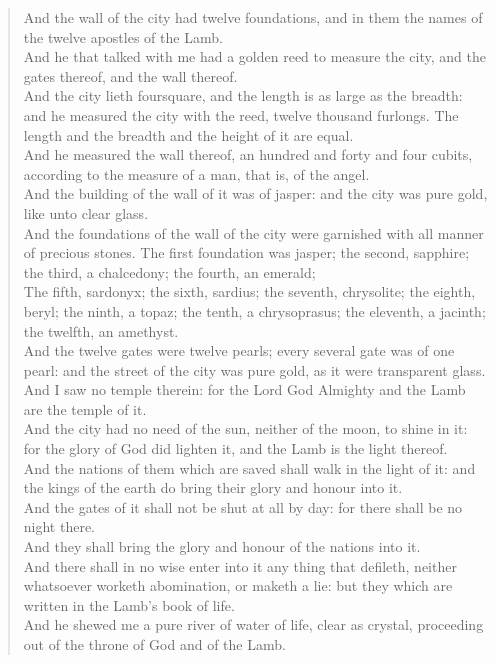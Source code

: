 \documentclass[MAIN]{subfiles}
\begin{document}
\begin{verse}
And the wall of the city had twelve foundations, and in them the names of the twelve apostles of the Lamb.\\
And he that talked with me had a golden reed to measure the city, and the gates thereof, and the wall thereof.\\
And the city lieth foursquare, and the length is as large as the breadth: and he measured the city with the reed, twelve thousand furlongs. The length and the breadth and the height of it are equal.\\
And he measured the wall thereof, an hundred and forty and four cubits, according to the measure of a man, that is, of the angel.\\
And the building of the wall of it was of jasper: and the city was pure gold, like unto clear glass.\\
And the foundations of the wall of the city were garnished with all manner of precious stones. The first foundation was jasper; the second, sapphire; the third, a chalcedony; the fourth, an emerald;\\
The fifth, sardonyx; the sixth, sardius; the seventh, chrysolite; the eighth, beryl; the ninth, a topaz; the tenth, a chrysoprasus; the eleventh, a jacinth; the twelfth, an amethyst.\\
And the twelve gates were twelve pearls; every several gate was of one pearl: and the street of the city was pure gold, as it were transparent glass.\\
And I saw no temple therein: for the Lord God Almighty and the Lamb are the temple of it.\\
And the city had no need of the sun, neither of the moon, to shine in it: for the glory of God did lighten it, and the Lamb is the light thereof.\\
And the nations of them which are saved shall walk in the light of it: and the kings of the earth do bring their glory and honour into it.\\
And the gates of it shall not be shut at all by day: for there shall be no night there.\\
And they shall bring the glory and honour of the nations into it.\\
And there shall in no wise enter into it any thing that defileth, neither whatsoever worketh abomination, or maketh a lie: but they which are written in the Lamb's book of life.\\
And he shewed me a pure river of water of life, clear as crystal, proceeding out of the throne of God and of the Lamb.\\

\end{verse}
\end{document}
